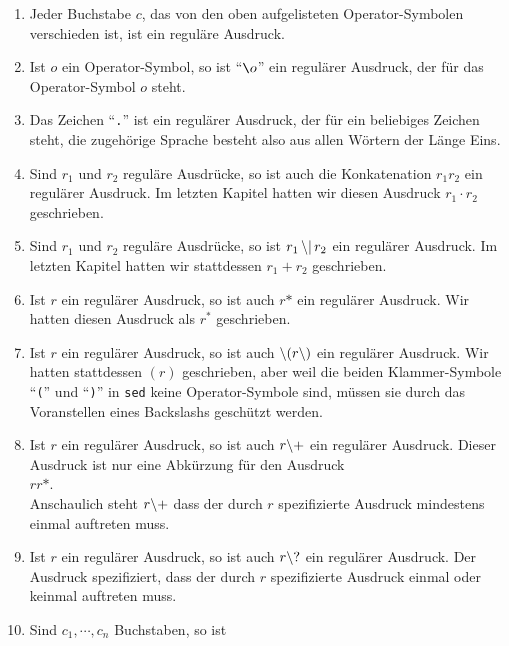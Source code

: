 \begin{enumerate}
\item Jeder Buchstabe $c$, das von den oben aufgelisteten Operator-Symbolen verschieden ist,
      ist ein regul\"are Ausdruck.
\item Ist $o$ ein Operator-Symbol, so ist ``$\texttt{\symbol{92}}o$'' ein regul\"arer
      Ausdruck, der f\"ur das Operator-Symbol $o$ steht.
\item Das Zeichen ``\texttt{.}'' ist ein regul\"arer Ausdruck, der f\"ur ein beliebiges
      Zeichen steht, die zugeh\"orige Sprache besteht also aus allen W\"ortern der L\"ange Eins.
\item Sind $r_1$ und $r_2$ regul\"are Ausdr\"ucke, so ist auch die Konkatenation $r_1r_2$
      ein regul\"arer Ausdruck.  Im letzten Kapitel hatten wir  diesen Ausdruck $r_1 \cdot r_2$
      geschrieben.
\item Sind $r_1$ und $r_2$ regul\"are Ausdr\"ucke, so ist  $r_1\,\mathtt{\symbol{92}|}\,r_2$
      ein regul\"arer Ausdruck.  Im letzten Kapitel hatten wir stattdessen $r_1 + r_2$
      geschrieben.
\item Ist $r$ ein regul\"arer Ausdruck, so ist auch $r\mathtt{*}$ ein regul\"arer Ausdruck.
      Wir hatten diesen Ausdruck als $r^*$ geschrieben.
\item Ist $r$ ein regul\"arer Ausdruck, so ist auch
      $\mathtt{\symbol{92}(}r\mathtt{\symbol{92})}$
      ein regul\"arer Ausdruck.  Wir hatten stattdessen $(r)$ geschrieben, aber weil die
      beiden Klammer-Symbole ``\texttt{(}'' und ``\texttt{)}'' in \texttt{sed} keine
      Operator-Symbole sind, m\"ussen sie durch das Voranstellen eines Backslashs gesch\"utzt 
      werden.
\item Ist $r$ ein regul\"arer Ausdruck, so ist auch $r\mathtt{\symbol{92}+}$ ein regul\"arer
      Ausdruck.   Dieser Ausdruck ist nur eine Abk\"urzung f\"ur den Ausdruck
      \\[0.2cm]
      \hspace*{1.3cm}
      $rr\mathtt{*}$.
      \\[0.2cm]
      Anschaulich steht $r\mathtt{\symbol{92}+}$ dass der durch $r$ spezifizierte
      Ausdruck mindestens einmal auftreten muss.
\item Ist $r$ ein regul\"arer Ausdruck, so ist auch $r\mathtt{\symbol{92}?}$ ein regul\"arer
      Ausdruck.  Der Ausdruck spezifiziert,
       dass der durch $r$ spezifizierte
      Ausdruck einmal oder keinmal auftreten muss.
\item Sind $c_1, \cdots, c_n$ Buchstaben, so ist

\end{enumerate}
